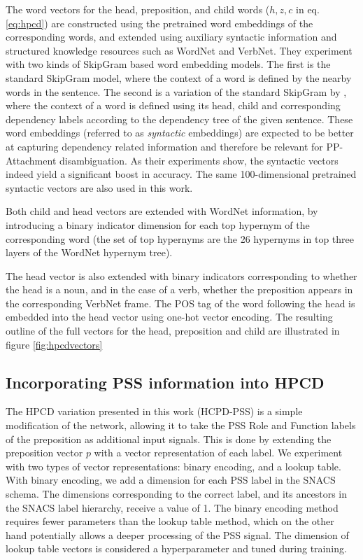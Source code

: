 The word vectors for the head, preposition, and child words ($h, z, c$ in eq. \ref{eq:hpcd}) are constructed using the pretrained word embeddings of the corresponding words, and extended using auxiliary syntactic information and structured knowledge resources such as WordNet and VerbNet. They experiment with two kinds of SkipGram based word embedding models. The first is the standard SkipGram model, where the context of a word is defined by the nearby words in the sentence. The second is a variation of the standard SkipGram by \cite{bansal}, where the context of a word is defined using its head, child and corresponding dependency labels according to the dependency tree of the given sentence. These word embeddings (referred to as \textit{syntactic} embeddings) are expected to be better at capturing dependency related information and therefore be relevant for PP-Attachment disambiguation. As their experiments show, the syntactic vectors indeed yield a significant boost in accuracy. The same 100-dimensional pretrained syntactic vectors are also used in this work. 

Both child and head vectors are extended with WordNet information, by introducing a binary indicator dimension for each top hypernym of the corresponding word (the set of top hypernyms are the 26 hypernyms in top three layers of the WordNet hypernym tree). 

The head vector is also extended with binary indicators corresponding to whether the head is a noun, and in the case of a verb, whether the preposition appears in the corresponding VerbNet frame. The POS tag of the word following the head is embedded into the head vector using one-hot vector encoding. The resulting outline of the full vectors for the head, preposition and child are illustrated in figure \ref{fig:hpcdvectors}
\\
\subsection{Incorporating PSS information into HPCD} \label{sec:hpcd_pss}

The HPCD variation presented in this work (HCPD-PSS) is a simple modification of the network, allowing it to take the PSS Role and Function labels of the preposition as additional input signals. This is done by extending the preposition vector $p$ with a vector representation of each label. We experiment with two types of vector representations: binary encoding, and a lookup table. With binary encoding, we add a dimension for each PSS label in the SNACS schema. The dimensions corresponding to the correct label, and its ancestors in the SNACS label hierarchy, receive a value of 1. The binary encoding method requires fewer parameters than the lookup table method, which on the other hand potentially allows a deeper processing of the PSS signal. The dimension of lookup table vectors is considered a hyperparameter and tuned during training.

